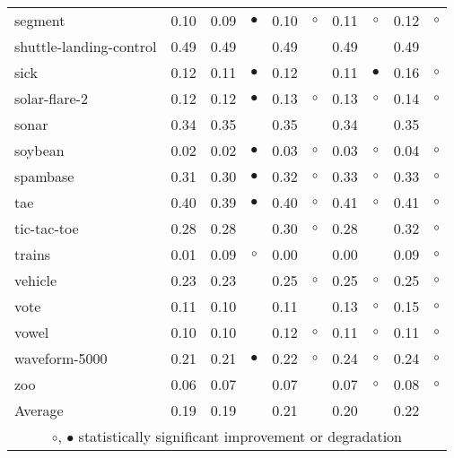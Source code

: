 \begin{table}[thb]
{\begin{tabular}{lrr@{\hspace{0.1cm}}cr@{\hspace{0.1cm}}cr@{\hspace{0.1cm}}cr@{\hspace{0.1cm}}c}
segment & 0.10 & 0.09 & $\bullet$ & 0.10 &   $\circ$ & 0.11 &   $\circ$ & 0.12 &  $\circ$\\
shuttle-landing-control & 0.49 & 0.49 &           & 0.49 &           & 0.49 &           & 0.49 &         \\
sick & 0.12 & 0.11 & $\bullet$ & 0.12 &           & 0.11 & $\bullet$ & 0.16 &  $\circ$\\
solar-flare-2 & 0.12 & 0.12 & $\bullet$ & 0.13 &   $\circ$ & 0.13 &   $\circ$ & 0.14 &  $\circ$\\
sonar & 0.34 & 0.35 &           & 0.35 &           & 0.34 &           & 0.35 &         \\
soybean & 0.02 & 0.02 & $\bullet$ & 0.03 &   $\circ$ & 0.03 &   $\circ$ & 0.04 &  $\circ$\\
spambase & 0.31 & 0.30 & $\bullet$ & 0.32 &   $\circ$ & 0.33 &   $\circ$ & 0.33 &  $\circ$\\
tae & 0.40 & 0.39 & $\bullet$ & 0.40 &   $\circ$ & 0.41 &   $\circ$ & 0.41 &  $\circ$\\
tic-tac-toe & 0.28 & 0.28 &           & 0.30 &   $\circ$ & 0.28 &           & 0.32 &  $\circ$\\
trains & 0.01 & 0.09 &   $\circ$ & 0.00 &           & 0.00 &           & 0.09 &  $\circ$\\
vehicle & 0.23 & 0.23 &           & 0.25 &   $\circ$ & 0.25 &   $\circ$ & 0.25 &  $\circ$\\
vote & 0.11 & 0.10 &           & 0.11 &           & 0.13 &   $\circ$ & 0.15 &  $\circ$\\
vowel & 0.10 & 0.10 &           & 0.12 &   $\circ$ & 0.11 &   $\circ$ & 0.11 &  $\circ$\\
waveform-5000 & 0.21 & 0.21 & $\bullet$ & 0.22 &   $\circ$ & 0.24 &   $\circ$ & 0.24 &  $\circ$\\
zoo & 0.06 & 0.07 &           & 0.07 &           & 0.07 &   $\circ$ & 0.08 &  $\circ$\\
\hline
Average & 0.19 & 0.19 &           & 0.21 &           & 0.20 &           & 0.22 &         \\
\hline
\multicolumn{10}{c}{$\circ$, $\bullet$ statistically significant improvement or degradation}\\
\end{tabular} \footnotesize \par}
\end{table}
